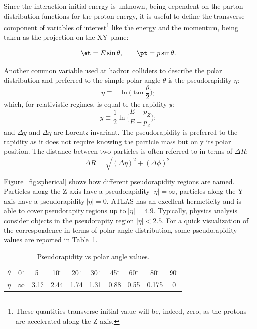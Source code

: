 Since the interaction initial energy is unknown, being dependent on the parton distribution functions for the proton
energy, it is useful to define the transverse component of variables of 
interest\footnote{These quantities transverse initial value will be, indeed, zero, as the protons are accelerated along the Z axis.}  
like the energy and the momentum, being taken as the projection on the XY plane:

\begin{equation}\label{eq:transv}
\et = E\sin\theta, \qquad \pt = p\sin\theta.
	\end{equation}

Another common variable used at hadron colliders to describe the polar distribution and preferred to the simple
polar angle $\theta$ is the pseudorapidity $\eta$:
\begin{equation}\label{eq:pseudorapidity}
        \eta \equiv -\ln\bigg(\tan\frac{\theta}{2}\bigg);
	\end{equation}
which, for relativistic regimes, is equal to the rapidity $y$:
\begin{equation}\label{eq:rapidity}
y \equiv \frac{1}{2} \ln \bigg(\frac{E+p_{Z}}{E-p_{Z}}\bigg);
	\end{equation}
and $\Delta y$ and $\Delta \eta$ are Lorentz invariant. The pseudorapidity is preferred
to the rapidity as it does not require knowing the particle mass but only its polar position.
The distance between two particles is often referred to in terms of $\Delta R$:
\begin{equation}\label{eq:deltar}
\Delta R = \sqrt{(\Delta\eta)^{2} + (\Delta\phi)^{2}}.
	\end{equation}


Figure~\ref{fig:spherical} shows how different pseudorapidity regions are named. Particles
along the Z axis have a pseudorapidity $|\eta|=\infty$, particles along the Y axis have
a pseudorapidity $|\eta|=0$. ATLAS has an excellent hermeticity and is able to cover 
pseudorapity regions up to $|\eta|=4.9$. Typically, physics analysis consider objects in
the pseudorapity region  $|\eta|<2.5$. For a quick visualization of the correspondence
in terms of polar angle distribution, some pseudorapidity values are reported in Table~\ref{tab:etatheta}.


\begin{table}[htb]\centering\begin{tabular}{cccccccccc}\toprule
$\theta$ & 0$^{\circ}$ & 5$^{\circ}$ & 10$^{\circ}$ & 20$^{\circ}$ & 30$^{\circ}$ & 45$^{\circ}$ & 60$^{\circ}$ & 80$^{\circ}$ & 90$^{\circ}$ \\
$\eta$ & $\infty$ & 3.13 & 2.44 & 1.74 & 1.31 & 0.88 & 0.55 & 0.175 & 0\\\bottomrule \end{tabular}
\caption{Pseudorapidity vs polar angle values.}\label{tab:etatheta}\end{table}

